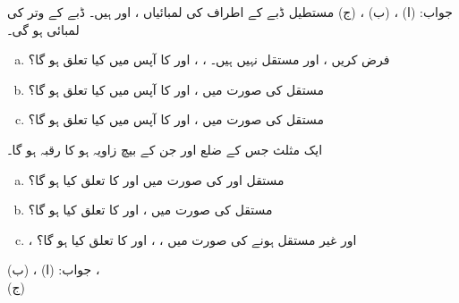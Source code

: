 جواب:\quad
(ا) ،
 (ب) ، 
(ج) 
مستطیل ڈبے کے اطراف کی لمبائیاں ،  اور  ہیں۔ ڈبے کے وتر کی لمبائی  ہو گی۔ 
\begin{enumerate}[a.]
\item
فرض کریں ،  اور  مستقل نہیں ہیں۔ ، ،  اور  کا آپس میں کیا تعلق ہو گا؟
\item
مستقل  کی صورت میں  ،  اور  کا آپس میں کیا تعلق ہو گا؟
\item
مستقل  کی صورت میں  ،  اور  کا آپس میں کیا تعلق ہو گا؟
\end{enumerate}
ایک مثلث جس کے ضلع  اور  جن کے بیچ زاویہ  ہو کا رقبہ  ہو گا۔
\begin{enumerate}[a.]
\item
مستقل  اور  کی صورت میں  اور  کا تعلق کیا ہو گا؟
\item
مستقل   کی صورت میں ،  اور  کا تعلق کیا ہو گا؟
\item
{}،  اور  غیر مستقل ہونے کی صورت میں ، ،  اور  کا تعلق کیا ہو گا؟
\end{enumerate}
جواب:\quad
(ا) ، 
(ب) ،\\
(ج) 
